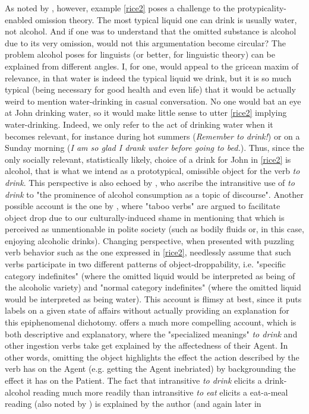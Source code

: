 As noted by \textcite[125]{Naess2007}, however, example \ref{rice2} poses a challenge to the protypicality-enabled omission theory. The most typical liquid one can drink is usually water, not alcohol. And if one was to understand that the omitted substance is alcohol due to its very omission, would not this argumentation become circular? The problem alcohol poses for linguists (or better, for linguistic theory) can be explained from different angles. I, for one, would appeal to the gricean maxim of relevance, in that water is indeed the typical liquid we drink, but it is so much typical (being necessary for good health and even life) that it would be actually weird to mention water-drinking in casual conversation. No one would bat an eye at John drinking water, so it would make little sense to utter \ref{rice2} implying water-drinking. Indeed, we only refer to the act of drinking water when it becomes relevant, for instance during hot summers (\textit{Remember to drink!}) or on a Sunday morning (\textit{I am so glad I drank water before going to bed.}). Thus, since the only socially relevant, statistically likely, choice of a drink for John in \ref{rice2} is alcohol, that is what we intend as a prototypical, omissible object for the verb \textit{to drink}. This perspective is also echoed by \textcite[14]{NewmanRice2006}, who ascribe the intransitive use of \textit{to drink} to "the prominence of alcohol consumption as a topic of discourse". Another possible account is the one by \textcite[21-28]{Goldberg2005}, where "taboo verbs" are argued to facilitate object drop due to our culturally-induced shame in mentioning that which is perceived as unmentionable in polite society (such as bodily fluids or, in this case, enjoying alcoholic drinks).  Changing perspective, when presented with puzzling verb behavior such as the one expressed in \ref{rice2}, \textcite[303-305]{HuddlestonEtAl2002} needlessly assume that such verbs participate in two different patterns of object-droppability, i.e. "specific category indefinites" (where the omitted liquid would be interpreted as being of the alcoholic variety) and "normal category indefinites" (where the omitted liquid would be interpreted as being water). This account is flimsy at best, since it puts labels on a given state of affairs without actually providing an explanation for this epiphenomenal dichotomy. \textcite[141]{Naess2007} offers a much more compelling account, which is both descriptive and explanatory, where the "specialized meanings" \textit{to drink} and other ingestion verbs take get explained by the affectedness of their Agent. In other words, omitting the object highlights the effect the action described by the verb has on the Agent (e.g. getting the Agent inebriated) by backgrounding the effect it has on the Patient. The fact that intransitive \textit{to drink} elicits a drink-alcohol reading much more readily than intransitive \textit{to eat} elicits a eat-a-meal reading (also noted by \textcite[14]{NewmanRice2006}) is explained by the author (and again later in 
